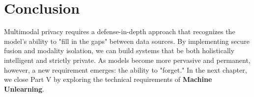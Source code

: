 \section{Conclusion}
\label{sec:conclusion_multimodal_ch16}

Multimodal privacy requires a defense-in-depth approach that recognizes the model's ability to "fill in the gaps" between data sources. By implementing secure fusion and modality isolation, we can build systems that be both holistically intelligent and strictly private. As models become more pervasive and permanent, however, a new requirement emerges: the ability to "forget." In the next chapter, we close Part V by exploring the technical requirements of \textbf{Machine Unlearning}.



